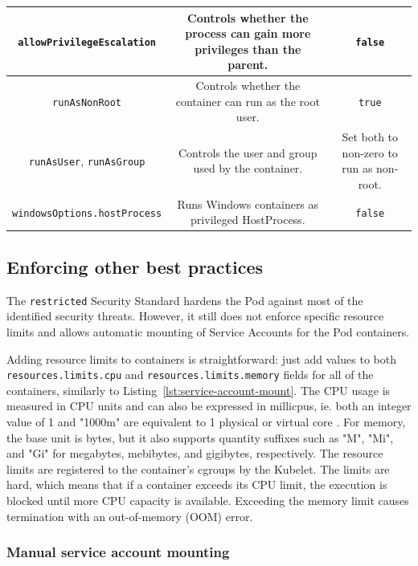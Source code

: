 \documentclass[english, 12pt, a4paper, sci, utf8, a-2b, online]{aaltothesis}
\begin{document}
\begin{table}[H]
\begin{minipage}{\textwidth}
\begin{tabularx}{\textwidth}{CCC}
    \lstinline{allowPrivilegeEscalation} & Controls whether the process can gain more privileges than the parent. & \lstinline{false} \\ \hline
    \lstinline{runAsNonRoot} & Controls whether the container can run as the root user. & \lstinline{true} \\ \hline
    \lstinline{runAsUser}, \lstinline{runAsGroup} & Controls the user and group used by the container. & Set both to non-zero to run as non-root. \\ \hline
    \lstinline{windowsOptions.hostProcess} & Runs Windows containers as privileged HostProcess. & \lstinline{false} \\ \hline
  \end{tabularx}
  \end{minipage}
\end{table}

\subsection{Enforcing other best practices}

The \lstinline{restricted} Security Standard hardens the Pod against most of the identified security threats.
However, it still does not enforce specific resource limits and allows automatic mounting of Service Accounts for the Pod containers.

Adding resource limits to containers is straightforward: just add values to both \lstinline{resources.limits.cpu} and \lstinline{resources.limits.memory} fields for all of the containers, similarly to Listing~\ref{lst:service-account-mount}.
The CPU usage is measured in CPU units and can also be expressed in millicpus, ie. both an integer value of 1 and "1000m" are equivalent to 1 physical or virtual core \cite{k8s-docs-resources}.
For memory, the base unit is bytes, but it also supports quantity suffixes such as "M", "Mi", and "Gi" for megabytes, mebibytes, and gigibytes, respectively.
The resource limits are registered to the container's cgroups by the Kubelet.
The limits are hard, which means that if a container exceeds its CPU limit, the execution is blocked until more CPU capacity is available.
Exceeding the memory limit causes termination with an out-of-memory (OOM) error.

\subsubsection{Manual service account mounting}
\end{document}
